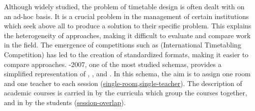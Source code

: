 Although widely studied, the problem of timetable design is often dealt with on an ad-hoc basis. It is a crucial problem in the management of certain institutions which seek above all to produce a solution to their specific problem. This explains the heterogeneity of approaches, making it difficult to evaluate and compare work in the field.
The emergence of competitions such as \ITC{} (International Timetabling Competition) has led to the creation of standardized formats, making it easier to compare approaches. %
\ITC{}-2007, one of the most studied schemas, 
provides a simplified representation of \ETT{}, \PETT{}, and \CBTT{}.
In this schema, the aim is to assign one room and one teacher to each session  
(\hyperref[feat:roommodal]{single-room},\hyperref[feat:teachermodal]{single-teacher}).
The description of academic courses is carried in \CBTT{} by the curricula which group the courses together, and in \PETT{} by the students 
(\hyperref[feat:studentsessionoverlap]{session-overlap}).
